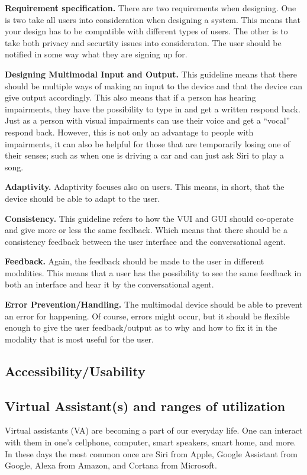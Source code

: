 \documentclass[fleqn,10pt]{wlscirep}
\begin{document}
\textbf{Requirement specification.}
There are two requirements when designing. One is two take all users into consideration when designing a system. This means that your design has to be compatible with different types of users. The other is to take both privacy and securtity issues into consideraton. The user should be notified in some way what they are signing up for. 

\textbf{Designing Multimodal Input and Output.}
This guideline means that there should be multiple ways of making an  input to the device and that the device can give output accordingly. 
This also means that if a person has hearing impairments, they have the possibility to type in and get a written respond back. Just as a person with visual impairments can use their voice and get a “vocal” respond back.
However, this is not only an advantage to people with impairments, it can also be helpful for those that are temporarily losing one of their senses; such as when one is driving a car and can just ask Siri to play a song. 

\textbf{Adaptivity.} 
Adaptivity focuses also on users. This means, in short, that the device should be able to adapt to the user. 

\textbf{Consistency.} 
This guideline refers to how the VUI and GUI should co-operate and give more or less the same feedback. Which means that there should be a consistency feedback between the user interface and the conversational agent. 

\textbf{Feedback.} 
Again, the feedback should be made to the user in different modalities. This means that a user has the possibility to see the same feedback in both an interface and hear it by the conversational agent. 

\textbf{Error Prevention/Handling.} 
The multimodal device should be able to prevent an error for happening. Of course, errors might occur, but it should be flexible enough to give the user feedback/output as to why and how to fix it in the modality that is most useful for the user. 

\subsection{Accessibility/Usability}

\subsection{Virtual Assistant(s) and ranges of utilization}
Virtual assistants (VA) are becoming a part of our everyday life. One can interact with them in one's cellphone, computer, smart speakers, smart home, and more. In these days the most common once are Siri from Apple, Google Assistant from Google, Alexa from Amazon, and Cortana from Microsoft. \cite{Berdasco.A, Hoy.M} %
\end{document}

